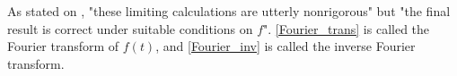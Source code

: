 As stated on \cite{page 205, FAA}, "these limiting calculations are utterly nonrigorous" but "the final result is correct under suitable conditions on $f$". \eqref{Fourier_trans} is called the Fourier transform of $f(t)$, and \eqref{Fourier_inv} is called the inverse Fourier transform.

%
%

